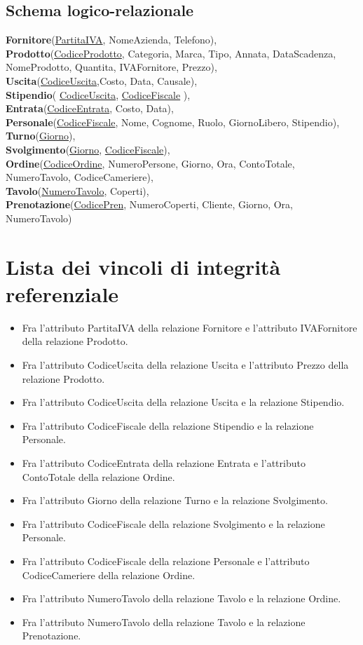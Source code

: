 \subsection{Schema logico-relazionale} %
\textbf{Fornitore}(\underline{PartitaIVA}, NomeAzienda, Telefono), \\ \smallskip
\textbf{Prodotto}(\underline{CodiceProdotto}, Categoria, Marca, Tipo, Annata, DataScadenza, NomeProdotto, Quantita, IVAFornitore, Prezzo), \\ \smallskip
\textbf{Uscita}(\underline{CodiceUscita},Costo, Data, Causale), \\ \smallskip
\textbf{Stipendio}( \underline{CodiceUscita}, \underline{CodiceFiscale} ), \\ \smallskip
\textbf{Entrata}(\underline{CodiceEntrata}, Costo, Data), \\ \smallskip
\textbf{Personale}(\underline{CodiceFiscale}, Nome, Cognome, Ruolo, GiornoLibero, Stipendio), \\ \smallskip
\textbf{Turno}(\underline{Giorno}), \\ \smallskip
\textbf{Svolgimento}(\underline{Giorno}, \underline{CodiceFiscale}), \\ \smallskip
\textbf{Ordine}(\underline{CodiceOrdine}, NumeroPersone, Giorno, Ora, ContoTotale, NumeroTavolo, CodiceCameriere), \\ \smallskip 
\textbf{Tavolo}(\underline{NumeroTavolo}, Coperti), \\ \smallskip
\textbf{Prenotazione}(\underline{CodicePren}, NumeroCoperti, Cliente, Giorno, Ora, NumeroTavolo)

\section{Lista dei vincoli di integrità referenziale}
\begin{itemize}
    \item Fra l'attributo PartitaIVA della relazione Fornitore e l'attributo IVAFornitore della relazione Prodotto.
    \item Fra l'attributo CodiceUscita della relazione Uscita e l'attributo Prezzo della relazione Prodotto.
    \item Fra l'attributo CodiceUscita della relazione Uscita e la relazione Stipendio.
    \item Fra l'attributo CodiceFiscale della relazione Stipendio e la relazione Personale.
    \item Fra l'attributo CodiceEntrata della relazione Entrata e l'attributo ContoTotale della relazione Ordine.
    \item Fra l'attributo Giorno della relazione Turno e la relazione Svolgimento.
    \item Fra l'attributo CodiceFiscale della relazione Svolgimento e la relazione Personale.
    \item Fra l'attributo CodiceFiscale della relazione Personale e l'attributo CodiceCameriere della relazione Ordine.
    \item Fra l'attributo NumeroTavolo della relazione Tavolo e la relazione Ordine.
    \item Fra l'attributo NumeroTavolo della relazione Tavolo e la relazione Prenotazione.
\end{itemize}
